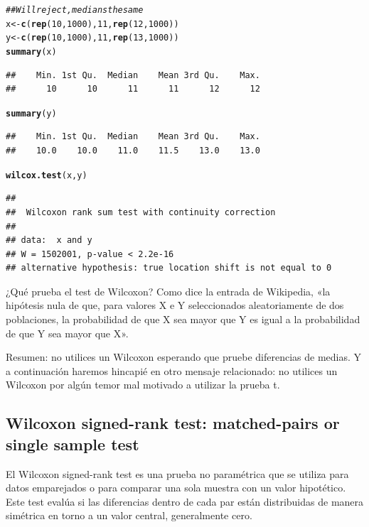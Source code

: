 \documentclass{config/apuntes}\usepackage[]{graphicx}\usepackage[]{xcolor}
\makeatletter
\newcommand{\hlnum}[1]{\textcolor[rgb]{0.686,0.059,0.569}{#1}}%
\newcommand{\hlcom}[1]{\textcolor[rgb]{0.678,0.584,0.686}{\textit{#1}}}%
\newcommand{\hldef}[1]{\textcolor[rgb]{0.345,0.345,0.345}{#1}}%
\newcommand{\hlkwb}[1]{\textcolor[rgb]{0.69,0.353,0.396}{#1}}%
\newcommand{\hlkwd}[1]{\textcolor[rgb]{0.737,0.353,0.396}{\textbf{#1}}}%
\newenvironment{kframe}{%
 \def\at@end@of@kframe{}%
 \ifinner\ifhmode%
  \def\at@end@of@kframe{\end{minipage}}%
  \begin{minipage}{\columnwidth}%
 \fi\fi%
 \def\FrameCommand##1{\hskip\@totalleftmargin \hskip-\fboxsep
 \colorbox{shadecolor}{##1}\hskip-\fboxsep
     \hskip-\linewidth \hskip-\@totalleftmargin \hskip\columnwidth}%
 \MakeFramed {\advance\hsize-\width
   \@totalleftmargin\z@ \linewidth\hsize
   \@setminipage}}%
 {\par\unskip\endMakeFramed%
 \at@end@of@kframe}
\newenvironment{knitrout}{}{} %
\makeatother
\begin{document}
\begin{knitrout}
\color{fgcolor}\begin{kframe}
\begin{alltt}
\hlcom{## Will reject, medians the same}
\hldef{x} \hlkwb{<-} \hlkwd{c}\hldef{(}\hlkwd{rep}\hldef{(}\hlnum{10}\hldef{,} \hlnum{1000}\hldef{),} \hlnum{11}\hldef{,} \hlkwd{rep}\hldef{(}\hlnum{12}\hldef{,} \hlnum{1000}\hldef{))}
\hldef{y} \hlkwb{<-} \hlkwd{c}\hldef{(}\hlkwd{rep}\hldef{(}\hlnum{10}\hldef{,} \hlnum{1000}\hldef{),} \hlnum{11}\hldef{,} \hlkwd{rep}\hldef{(}\hlnum{13}\hldef{,} \hlnum{1000}\hldef{))}
\hlkwd{summary}\hldef{(x)}
\end{alltt}
\begin{verbatim}
##    Min. 1st Qu.  Median    Mean 3rd Qu.    Max. 
##      10      10      11      11      12      12
\end{verbatim}
\begin{alltt}
\hlkwd{summary}\hldef{(y)}
\end{alltt}
\begin{verbatim}
##    Min. 1st Qu.  Median    Mean 3rd Qu.    Max. 
##    10.0    10.0    11.0    11.5    13.0    13.0
\end{verbatim}
\begin{alltt}
\hlkwd{wilcox.test}\hldef{(x, y)}
\end{alltt}
\begin{verbatim}
## 
## 	Wilcoxon rank sum test with continuity correction
## 
## data:  x and y
## W = 1502001, p-value < 2.2e-16
## alternative hypothesis: true location shift is not equal to 0
\end{verbatim}
\end{kframe}
\end{knitrout}

¿Qué prueba el test de Wilcoxon? Como dice la entrada de Wikipedia, «la hipótesis nula de que, para valores X e Y seleccionados aleatoriamente de dos poblaciones, la probabilidad de que X sea mayor que Y es igual a la probabilidad de que Y sea mayor que X».

Resumen: no utilices un Wilcoxon esperando que pruebe diferencias de medias. Y a continuación haremos hincapié en otro mensaje relacionado: no utilices un Wilcoxon por algún temor mal motivado a utilizar la prueba t.

\subsection{Wilcoxon signed-rank test: matched-pairs or single sample test}
El Wilcoxon signed-rank test es una prueba no paramétrica que se utiliza para datos emparejados o para comparar una sola muestra con un valor hipotético. Este test evalúa si las diferencias dentro de cada par están distribuidas de manera simétrica en torno a un valor central, generalmente cero.
\end{document}
